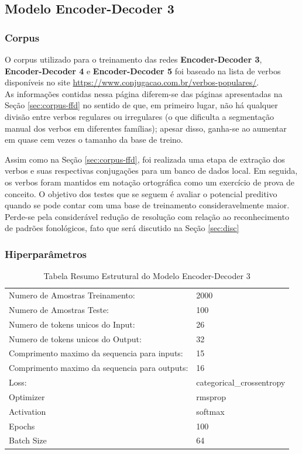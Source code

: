 \subsection{Modelo Encoder-Decoder 3}
 
\subsubsection{Corpus}

O corpus utilizado para o treinamento das redes \textbf{Encoder-Decoder 3}, \textbf{Encoder-Decoder 4} e \textbf{Encoder-Decoder 5}  foi baseado na lista de verbos disponíveis no site \url{https://www.conjugacao.com.br/verbos-populares/}.\\

As informações contidas nessa página diferem-se das páginas apresentadas na Seção \ref{sec:corpus-ffd} no sentido de que, em primeiro lugar, não há qualquer divisão entre verbos regulares ou irregulares (o que dificulta a segmentação manual dos verbos em diferentes famílias); apesar disso, ganha-se ao aumentar em quase cem vezes o tamanho da base de treino. 

Assim como na Seção \ref{sec:corpus-ffd}, foi realizada uma etapa de extração dos verbos e suas respectivas conjugações para um banco de dados local. Em seguida, os verbos foram mantidos em notação ortográfica como um exercício de prova de conceito. O objetivo dos testes que se seguem é avaliar o potencial preditivo quando se pode contar com uma base de treinamento consideravelmente maior. Perde-se pela considerável redução de resolução com relação ao reconhecimento de padrões fonológicos, fato que será discutido na Seção \ref{sec:disc}

\subsubsection{Hiperparâmetros} 

\begin{table}[H]
\centering
\begin{tabular}{ll}
Numero de Amostras Treinamento: & 2000 \\
Numero de Amostras Teste: & 100 \\
Numero de tokens unicos do Input: & 26 \\
Numero de tokens unicos do Output: & 32 \\
Comprimento maximo da sequencia para inputs: & 15 \\
Comprimento maximo da sequencia para outputs: & 16 \\
Loss: & categorical\_crossentropy \\
Optimizer & rmsprop \\
Activation & softmax \\
Epochs & 100 \\
Batch Size & 64
\end{tabular}
\caption{Tabela Resumo Estrutural do Modelo Encoder-Decoder 3}
\label{tab:res3}
\end{table}


